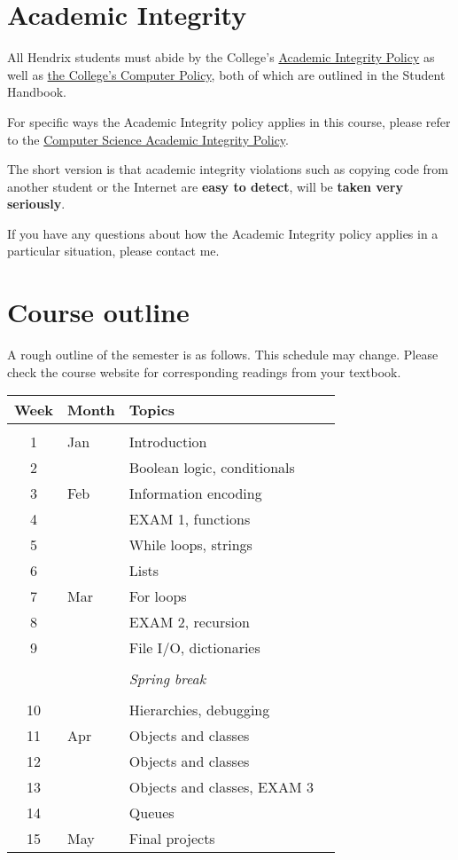 \documentclass{article}
\begin{document}
\section*{Academic Integrity}

All Hendrix students must abide by the College's
\href{https://www.hendrix.edu/studentlife/handbook.aspx?id=67121}{Academic
Integrity Policy} as well as
\href{https://www.hendrix.edu/studentlife/handbook.aspx?id=42308}{the
College's Computer Policy}, both of which are outlined in the Student
Handbook.

For specific ways the Academic Integrity policy applies in this
course, please refer to the
\href{http://ozark.hendrix.edu/~yorgey/ac-integrity-policy.html}{Computer
  Science Academic Integrity Policy}.

The short version is that academic integrity violations such as
copying code from another student or the Internet are \textbf{easy to
  detect}, will be \textbf{taken
very seriously}.

If you have any questions about how the Academic Integrity policy
applies in a particular situation, please contact me.

\section*{Course outline}

A rough outline of the semester is as follows.  This schedule may
change.  Please check the course website for corresponding readings
from your textbook.

\begin{tabular}{cllp{3in}}
  Week & Month & Topics \\
  \hline \\
  1 & Jan & Introduction \\
  2 &     & Boolean logic, conditionals \\
  3 & Feb & Information encoding \\
  4 &     & EXAM 1, functions \\
  5 &     & While loops, strings \\
  6 &     & Lists \\
  7 & Mar & For loops \\
  8 &     & EXAM 2, recursion \\
  9 &     & File I/O, dictionaries \\
  & & \\
  & & \emph{Spring break} \\
  & & \\
  10 &    & Hierarchies, debugging \\
  11 & Apr & Objects and classes \\
  12 &     & Objects and classes \\
  13 &     & Objects and classes, EXAM 3 \\
  14 &     & Queues \\
  15 & May & Final projects
\end{tabular}
\end{document}
